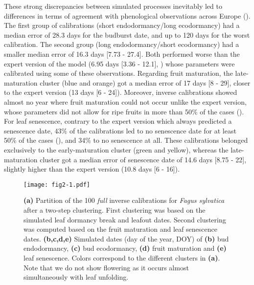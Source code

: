 \documentclass[letterpaper,8pt]{extarticle}  %
\begin{document}
\begin{doublespacing}
\begin{linenumbers}
These strong discrepancies between simulated processes inevitably led to differences in terms of agreement with phenological observations across Europe (). The first group of calibrations (short endodormancy/long ecodormancy) had a median error of 28.3 days for the budburst date, and up to 120 days for the worst calibration. The second group (long endodormancy/short ecodormancy) had a smaller median error of 16.3 days [7.73 - 27.4]. Both performed worse than the expert version of the model (6.95 days [3.36 - 12.1], ) whose parameters were calibrated using some of these observations. Regarding fruit maturation, the late-maturation cluster (blue and orange) got a median error of 17 days [8 - 29], closer to the expert version (13 days [6 - 24]). Moreover, inverse calibrations showed almost no year where fruit maturation could not occur unlike the expert version, whose parameters did not allow for ripe fruits in more than 50\% of the cases (). For leaf senescence, contrary to the expert version which always predicted a senescence date, 43\% of the calibrations led to no senescence date for at least 50\% of the cases (), and 34\% to no senescence at all. These calibrations belonged exclusively to the early-maturation cluster (green and yellow), whereas the late-maturation cluster got a median error of senescence date of 14.6 days [8.75 - 22], slightly higher than the expert version (10.8 days [6 - 16]).

\begin{figure}[hp]
\centering
\begin{subcaptiongroup}
\label{fig:2A} 
\label{fig:2B}
\label{fig:2C}
\label{fig:2D}
\label{fig:2E}
\end{subcaptiongroup}
\texttt{[image: fig2-1.pdf]}
\caption{\textbf{(a)} Partition of the 100 \emph{full} inverse calibrations for \emph{Fagus sylvatica} after a two-step clustering. First clustering was based on the simulated leaf dormancy break and leafout dates. Second clustering was computed based on the fruit maturation and leaf senescence dates. \textbf{(b,c,d,e)} Simulated dates (day of the year, DOY) of \textbf{(b)} bud endodormancy, \textbf{(c)} bud ecodormancy, \textbf{(d)} fruit maturation and \textbf{(e)} leaf senescence. Colors correspond to the different clusters in \textbf{(a)}. Note that we do not show flowering as it occurs almost simultaneously with leaf unfolding.}
\label{fig:2}
\end{figure}


\end{linenumbers}
\end{doublespacing}
\end{document}
